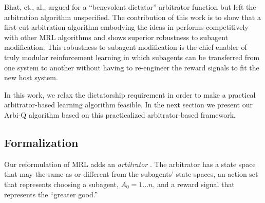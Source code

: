 Bhat, et., al., \cite{bhat2006on-the-difficulty} argued for a ``benevolent dictator'' arbitrator function but left the arbitration algorithm unspecified.  The contribution of this work is to show that a first-cut arbitration algorithm embodying the ideas in \cite{bhat2006on-the-difficulty} performs competitively with other MRL algorithms and shows superior robustness to subagent modification.  This robustness to subagent modification is the chief enabler of truly modular reinforcement learning in which subagents can be transferred from one system to another without having to re-engineer the reward signals to fit the new host system.

In this work, we relax the dictatorship requirement in order to make a
practical arbitrator-based learning algorithm feasible.  In the next
section we present our Arbi-Q algorithm based on this practicalized
arbitrator-based framework.




\subsection{Formalization}

Our reformulation of MRL adds an {\em arbitrator} \cite{brooks1986a-robust}.  The arbitrator has a state space that may the same as or different from the subagents' state spaces, an action set that represents choosing a subagent, $A_0 = {1 ... n}$, and a reward signal that represents the ``greater good.''


